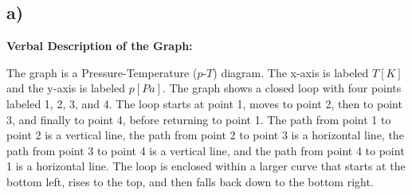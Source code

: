 

\subsection*{a)}

\begin{center}
\textbf{Verbal Description of the Graph:}
\end{center}

The graph is a Pressure-Temperature ($p$-$T$) diagram. The x-axis is labeled $T [K]$ and the y-axis is labeled $p [Pa]$. The graph shows a closed loop with four points labeled 1, 2, 3, and 4. The loop starts at point 1, moves to point 2, then to point 3, and finally to point 4, before returning to point 1. The path from point 1 to point 2 is a vertical line, the path from point 2 to point 3 is a horizontal line, the path from point 3 to point 4 is a vertical line, and the path from point 4 to point 1 is a horizontal line. The loop is enclosed within a larger curve that starts at the bottom left, rises to the top, and then falls back down to the bottom right.
